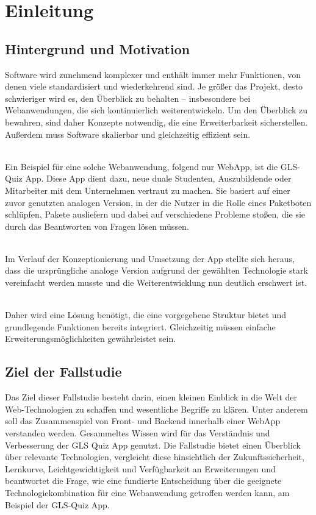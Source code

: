 \documentclass[biblatex]{lni}
\begin{document}
\section{Einleitung}

\subsection{Hintergrund und Motivation}
Software wird zunehmend komplexer und enthält immer mehr Funktionen, von denen viele standardisiert und wiederkehrend sind.
Je größer das Projekt, desto schwieriger wird es, den Überblick zu behalten – insbesondere bei Webanwendungen,
die sich kontinuierlich weiterentwickeln.
Um den Überblick zu bewahren, sind daher Konzepte notwendig, die eine Erweiterbarkeit sicherstellen.
Außerdem muss Software skalierbar und gleichzeitig effizient sein.

\\

Ein Beispiel für eine solche Webanwendung, folgend nur WebApp, ist die GLS-Quiz App.
Diese App dient dazu, neue duale Studenten, Auszubildende oder Mitarbeiter mit dem Unternehmen vertraut zu machen.
Sie basiert auf einer zuvor genutzten analogen Version, in der die Nutzer in die Rolle eines Paketboten schlüpfen,
Pakete ausliefern und dabei auf verschiedene Probleme stoßen, die sie durch das Beantworten von Fragen lösen müssen.

\\

Im Verlauf der Konzeptionierung und Umsetzung der App stellte sich heraus,
dass die ursprüngliche analoge Version aufgrund der gewählten Technologie stark vereinfacht werden musste
und die Weiterentwicklung nun deutlich erschwert ist.

\\

Daher wird eine Lösung benötigt,
die eine vorgegebene Struktur bietet und grundlegende Funktionen bereits integriert.
Gleichzeitig müssen einfache Erweiterungsmöglichkeiten gewährleistet sein.

\subsection{Ziel der Fallstudie}

Das Ziel dieser Fallstudie besteht darin,
einen kleinen Einblick in die Welt der Web-Technologien zu schaffen und wesentliche Begriffe zu klären.
Unter anderem soll das Zusammenspiel von Front- und Backend innerhalb einer \ac{WebApp} verstanden werden.
Gesammeltes Wissen wird für das Verständnis und Verbesserung der GLS Quiz App genutzt.
Die Fallstudie bietet einen Überblick über relevante Technologien,
vergleicht diese hinsichtlich der Zukunftssicherheit, Lernkurve, Leichtgewichtigkeit und Verfügbarkeit an Erweiterungen
und beantwortet die Frage,
wie eine fundierte Entscheidung über die geeignete Technologiekombination für eine Webanwendung getroffen werden kann,
am Beispiel der GLS-Quiz App.
\end{document}
